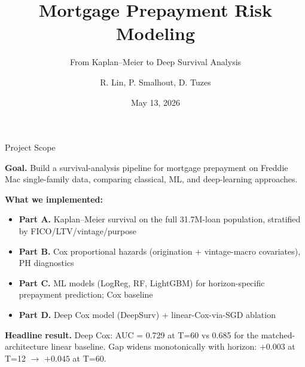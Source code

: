 \documentclass[10pt,aspectratio=169]{beamer}
\title{Mortgage Prepayment Risk Modeling}
\subtitle{From Kaplan--Meier to Deep Survival Analysis}
\author{R. Lin, P. Smalhout, D. Tuzes}
\institute{IR and Credit}
\date{May 13, 2026}
\begin{document}
\begin{frame}[plain]
    \titlepage
\end{frame}

\begin{frame}{Project Scope}

    \textbf{Goal.} Build a survival-analysis pipeline for mortgage prepayment on Freddie Mac single-family data, comparing classical, ML, and deep-learning approaches.

    \vspace{0.6em}

    \textbf{What we implemented:}
    \begin{itemize}\itemsep2pt
        \item \textbf{Part A.} Kaplan--Meier survival on the full 31.7M-loan population, stratified by FICO/LTV/vintage/purpose
        \item \textbf{Part B.} Cox proportional hazards (origination + vintage-macro covariates), PH diagnostics
        \item \textbf{Part C.} ML models (LogReg, RF, LightGBM) for horizon-specific prepayment prediction; Cox baseline
        \item \textbf{Part D.} Deep Cox model (DeepSurv) + linear-Cox-via-SGD ablation
    \end{itemize}

    \vspace{0.6em}

    \textbf{Headline result.} Deep Cox: AUC = 0.729 at T=60 vs 0.685 for the matched-architecture linear baseline. Gap widens monotonically with horizon: $+0.003$ at T=12 $\to$ $+0.045$ at T=60.

\end{frame}
\end{document}

